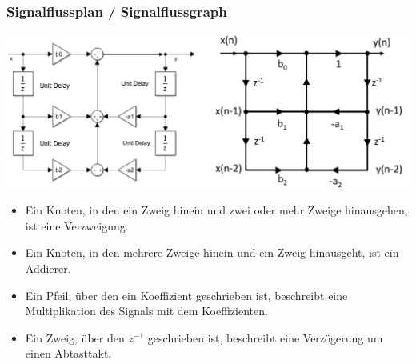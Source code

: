 \subsubsection{Signalflussplan / Signalflussgraph}

\includegraphics[width=\columnwidth]{Bilder/Signalfluss_plan-graph}

\begin{itemize}
	\item Ein Knoten, in den ein Zweig hinein und zwei oder mehr Zweige
	      hinausgehen, ist eine Verzweigung.
	\item Ein Knoten, in den mehrere Zweige hinein und ein Zweig hinausgeht,
	      ist ein Addierer.
	\item Ein Pfeil, über den ein Koeffizient geschrieben ist, beschreibt
	      eine Multiplikation des Signals mit dem Koeffizienten.
	\item Ein Zweig, über den $z^{-1}$ geschrieben ist, beschreibt eine
	      Verzögerung um einen Abtasttakt.
\end{itemize}


